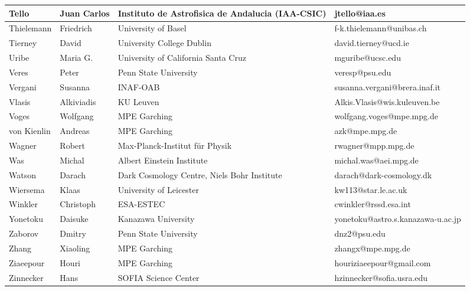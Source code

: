 \begin{center}
\begin{longtable}{|p{1.6cm} |p{1.6cm} |p{2cm} |p{3cm} |}
\tiny Tello &\tiny Juan Carlos & \tiny Instituto de Astrofisica de Andalucia (IAA-CSIC) & \tiny jtello@iaa.es \\ \hline
\tiny Thielemann &\tiny Friedrich & \tiny University of Basel & \tiny f-k.thielemann@unibas.ch \\ \hline
\tiny Tierney &\tiny David & \tiny University College Dublin & \tiny david.tierney@ucd.ie \\ \hline
\tiny Uribe &\tiny Maria G. & \tiny University of California Santa Cruz & \tiny mguribe@ucsc.edu \\ \hline
\tiny Veres &\tiny Peter & \tiny Penn State University & \tiny veresp@psu.edu \\ \hline
\tiny Vergani &\tiny Susanna & \tiny INAF-OAB & \tiny susanna.vergani@brera.inaf.it \\ \hline
\tiny Vlasis &\tiny Alkiviadis & \tiny KU Leuven & \tiny Alkis.Vlasis@wis.kuleuven.be \\ \hline
\tiny Voges &\tiny Wolfgang & \tiny MPE Garching & \tiny wolfgang.voges@mpe.mpg.de \\ \hline
\tiny von Kienlin &\tiny Andreas & \tiny MPE Garching & \tiny azk@mpe.mpg.de \\ \hline
\tiny Wagner &\tiny Robert & \tiny Max-Planck-Institut f\"ur Physik & \tiny rwagner@mpp.mpg.de \\ \hline
\tiny Was &\tiny Michal & \tiny Albert Einstein Institute & \tiny michal.was@aei.mpg.de \\ \hline
\tiny Watson &\tiny Darach & \tiny Dark Cosmology Centre, Niels Bohr Institute & \tiny darach@dark-cosmology.dk \\ \hline
\tiny Wiersema &\tiny Klaas & \tiny University of Leicester & \tiny kw113@star.le.ac.uk \\ \hline
\tiny Winkler &\tiny Christoph & \tiny ESA-ESTEC & \tiny cwinkler@rssd.esa.int \\ \hline
\tiny Yonetoku &\tiny Daisuke & \tiny Kanazawa University & \tiny yonetoku@astro.s.kanazawa-u.ac.jp \\ \hline
\tiny Zaborov &\tiny Dmitry & \tiny Penn State University & \tiny dnz2@psu.edu \\ \hline
\tiny Zhang &\tiny Xiaoling & \tiny MPE Garching & \tiny zhangx@mpe.mpg.de \\ \hline
\tiny Ziaeepour &\tiny Houri & \tiny MPE Garching & \tiny houriziaeepour@gmail.com \\ \hline
\tiny Zinnecker &\tiny Hans & \tiny SOFIA Science Center & \tiny hzinnecker@sofia.usra.edu \\ \hline
    \hline
  \end{longtable}
\end{center}
